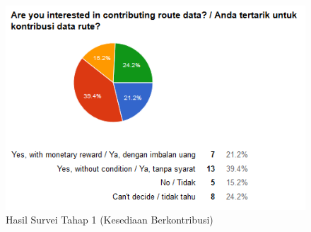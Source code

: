 \begin{figure}
	\centering
	\includegraphics[scale=0.75]{Gambar/5_hasilsurvei_1_3}
	\caption{Hasil Survei Tahap 1 (Kesediaan Berkontribusi)} 
	\label{fig:5_hasilsurvei_1_3}
\end{figure}